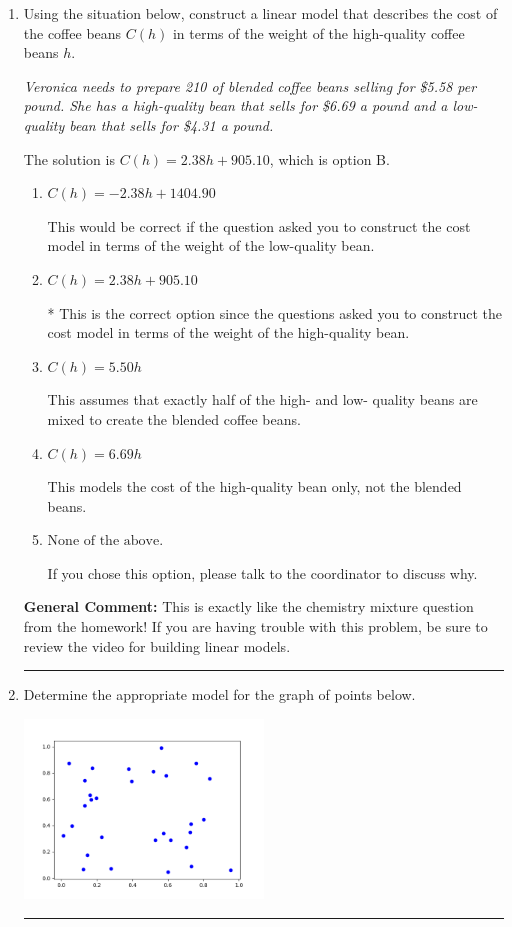 \documentclass{extbook}[14pt]
\newcommand{\litem}[1]{\item #1

\rule{\textwidth}{0.4pt}}
\begin{document}
\begin{enumerate}\litem{
Using the situation below, construct a linear model that describes the cost of the coffee beans $C(h)$ in terms of the weight of the high-quality coffee beans $h$.

\begin{center}
    \textit{ Veronica needs to prepare 210 of blended coffee beans selling for \$5.58 per pound. She has a high-quality bean that sells for \$6.69 a pound and a low-quality bean that sells for \$4.31 a pound. }
\end{center}
The solution is \( C(h) = 2.38 h + 905.10 \), which is option B.\begin{enumerate}[label=\Alph*.]
\item \( C(h) = -2.38 h + 1404.90 \)

This would be correct if the question asked you to construct the cost model in terms of the weight of the low-quality bean.
\item \( C(h) = 2.38 h + 905.10 \)

* This is the correct option since the questions asked you to construct the cost model in terms of the weight of the high-quality bean.
\item \( C(h) = 5.50 h \)

This assumes that exactly half of the high- and low- quality beans are mixed to create the blended coffee beans.
\item \( C(h) = 6.69 h \)

This models the cost of the high-quality bean only, not the blended beans.
\item \( \text{None of the above.} \)

If you chose this option, please talk to the coordinator to discuss why.
\end{enumerate}

\textbf{General Comment:} This is exactly like the chemistry mixture question from the homework! If you are having trouble with this problem, be sure to review the video for building linear models.
}
\litem{
Determine the appropriate model for the graph of points below.

\begin{center}
    \includegraphics[width=0.5\textwidth]{../Figures/identifyModelGraph12CopyA.png}
\end{center}


}
\end{enumerate}
\end{document}
